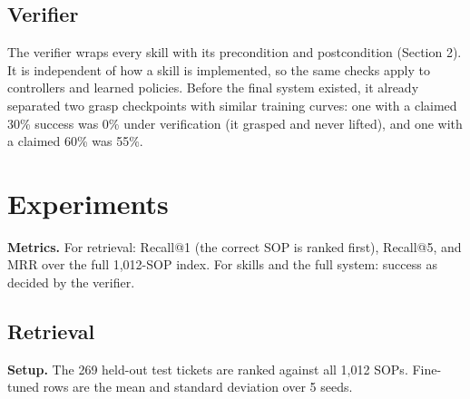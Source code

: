 \documentclass[
  10pt,
  twocolumn]{article}
\begin{document}
\subsection{Verifier}\label{verifier}

The verifier wraps every skill with its precondition and postcondition
(Section 2). It is independent of how a skill is implemented, so the
same checks apply to controllers and learned policies. Before the final
system existed, it already separated two grasp checkpoints with similar
training curves: one with a claimed 30\% success was 0\% under
verification (it grasped and never lifted), and one with a claimed 60\%
was 55\%.

\section{Experiments}\label{experiments}

\textbf{Metrics.} For retrieval: Recall@1 (the correct SOP is ranked
first), Recall@5, and MRR over the full 1,012-SOP index. For skills and
the full system: success as decided by the verifier.

\subsection{Retrieval}\label{retrieval}

\textbf{Setup.} The 269 held-out test tickets are ranked against all
1,012 SOPs. Fine-tuned rows are the mean and standard deviation over 5
seeds.
\end{document}

